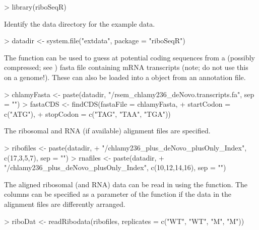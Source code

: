 \documentclass[a4paper]{article}
\begin{document}
\begin{Schunk}
\begin{Sinput}
> library(riboSeqR)
\end{Sinput}
\end{Schunk}

Identify the data directory for the example data. 

\begin{Schunk}
\begin{Sinput}
> datadir <- system.file("extdata", package = "riboSeqR")
\end{Sinput}
\end{Schunk}

The  function can be used to guess at potential coding sequences from a (possibly compressed; see ) fasta file containing mRNA transcripts (note; do not use this on a genome!). These can also be loaded into a  object from an annotation file.

\begin{Schunk}
\begin{Sinput}
> chlamyFasta <- paste(datadir, "/rsem_chlamy236_deNovo.transcripts.fa", sep = "")
> fastaCDS <- findCDS(fastaFile = chlamyFasta, 
+                     startCodon = c("ATG"), 
+                     stopCodon = c("TAG", "TAA", "TGA"))
\end{Sinput}
\end{Schunk}

The ribosomal and RNA (if available) alignment files are specified.
\begin{Schunk}
\begin{Sinput}
> ribofiles <- paste(datadir, 
+                    "/chlamy236_plus_deNovo_plusOnly_Index", c(17,3,5,7), sep = "")
> rnafiles <- paste(datadir, 
+                   "/chlamy236_plus_deNovo_plusOnly_Index", c(10,12,14,16), sep = "")
\end{Sinput}
\end{Schunk}

The aligned ribosomal (and RNA) data can be read in using the  function. The columns can be specified as a parameter of the  function if the data in the alignment files are differently arranged.

\begin{Schunk}
\begin{Sinput}
> riboDat <- readRibodata(ribofiles, replicates = c("WT", "WT", "M", "M"))
\end{Sinput}
\end{Schunk}
\end{document}
